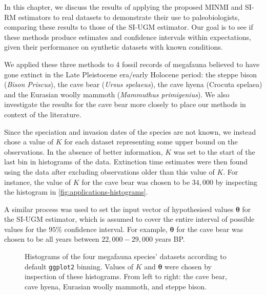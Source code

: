 
In this chapter, we discuss the results of applying the proposed MINMI and SI-RM estimators to real datasets to demonstrate their use to paleobiologists, comparing these results to those of the SI-UGM estimator. Our goal is to see if these methods produce estimates and confidence intervals within expectations, given their performance on synthetic datasets with known conditions.

We applied these three methods to 4 fossil records of megafauna believed to have gone extinct in the Late Pleistocene era/early Holocene period: the steppe bison (\textit{Bison Priscus}), the cave bear (\textit{Ursus spelaeus}), the cave hyena (Crocuta spelaea) and the Eurasian woolly mammoth (\textit{Mammuthus primigenius}). We also investigate the results for the cave bear more closely to place our methods in context of the literature.

Since the speciation and invasion dates of the species are not known, we instead chose a value of $K$ for each dataset representing some upper bound on the observations. In the absence of better information, $K$ was set to the start of the last bin in histograms of the data. Extinction time estimates were then found using the data after excluding observations older than this value of $K$. For instance, the value of $K$ for the cave bear was chosen to be $34,000$ by inspecting the histogram in \autoref{fig:applications-histograms}.

A similar process was used to set the input vector of hypothesised values $\bm{\theta}$ for the SI-UGM estimator, which is assumed to cover the entire interval of possible values for the $95\%$ confidence interval. For example, $\bm{\theta}$ for the cave bear was chosen to be all years between $22,000 - 29,000$ years BP.
\begin{figure}[ht]
    \centering
    
    \caption{Histograms of the four megafauna species' datasets according to default \texttt{ggplot2} binning. Values of $K$ and $\bm{\theta}$ were chosen by inspection of these histograms. From left to right: the cave bear, cave hyena, Eurasian woolly mammoth, and steppe bison.}
    \label{fig:applications-histograms}
\end{figure}

